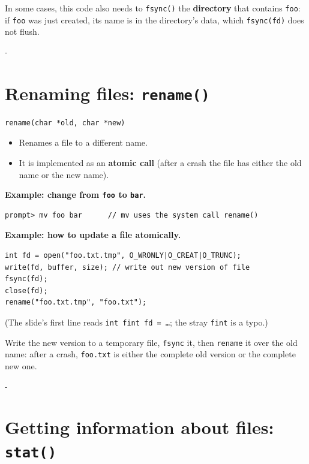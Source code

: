 \documentclass[11pt,a4paper]{article}
\makeatletter
\newcommand{\keepspace}[1]{\par\penalty-100\begingroup
  \setlength{\dimen@}{#1}\dimen@ii\pagegoal\advance\dimen@ii-\pagetotal
  \ifdim\dimen@>\dimen@ii\ifdim\dimen@ii>\z@\vfil\fi\break\fi\endgroup}
\makeatother
\begin{document}
\begin{warnbox}
In some cases, this code also needs to \texttt{fsync()} the
\textbf{directory} that contains \texttt{foo}: if \texttt{foo} was just
created, its name is in the directory's data, which \texttt{fsync(fd)} does
not flush.
\end{warnbox}

\keepspace{7\baselineskip}
\section{Renaming files: \texttt{rename()}}

\begin{lstlisting}[numbers=none]
rename(char *old, char *new)
\end{lstlisting}
\begin{itemize}
  \item Renames a file to a different name.
  \item It is implemented as an \textbf{atomic call} (after a crash the file
        has either the old name or the new name).
\end{itemize}

\textbf{Example: change from \texttt{foo} to \texttt{bar}.}
\begin{lstlisting}[style=term]
prompt> mv foo bar      // mv uses the system call rename()
\end{lstlisting}

\textbf{Example: how to update a file atomically.}
\begin{lstlisting}
int fd = open("foo.txt.tmp", O_WRONLY|O_CREAT|O_TRUNC);
write(fd, buffer, size); // write out new version of file
fsync(fd);
close(fd);
rename("foo.txt.tmp", "foo.txt");
\end{lstlisting}
{\small (The slide's first line reads \texttt{int fint fd = \ldots}; the stray
\texttt{fint} is a typo.)}

Write the new version to a temporary file, \texttt{fsync} it, then
\texttt{rename} it over the old name: after a crash, \texttt{foo.txt} is
either the complete old version or the complete new one.

\keepspace{7\baselineskip}
\section{Getting information about files: \texttt{stat()}}
\end{document}
